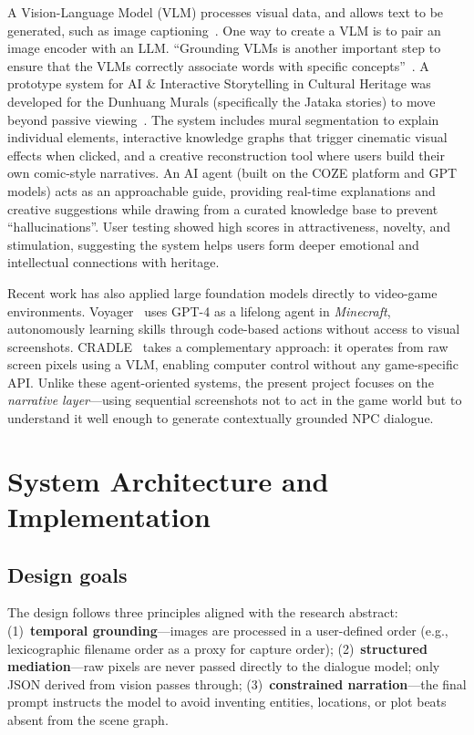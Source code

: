 \documentclass[11pt]{article}
\begin{document}
A Vision-Language Model (VLM) processes visual data, and allows text to be generated,
such as image captioning~\cite{bordes2024introductionvisionlanguagemodeling}.
One way to create a VLM is to pair an image encoder with an LLM.
``Grounding VLMs is another important step to ensure
that the VLMs correctly associate words with specific concepts''~\cite{bordes2024introductionvisionlanguagemodeling}.
A prototype system for AI \& Interactive Storytelling in Cultural Heritage was developed for the Dunhuang Murals (specifically the Jataka stories) to move beyond passive viewing~\cite{11227644}. The system includes mural segmentation to explain individual elements, interactive knowledge graphs that trigger cinematic visual effects when clicked, and a creative reconstruction tool where users build their own comic-style narratives. An AI agent (built on the COZE platform and GPT models) acts as an approachable guide, providing real-time explanations and creative suggestions while drawing from a curated knowledge base to prevent ``hallucinations''. User testing showed high scores in attractiveness, novelty, and stimulation, suggesting the system helps users form deeper emotional and intellectual connections with heritage.

Recent work has also applied large foundation models directly to video-game environments. Voyager~\cite{Wang2023Voyager} uses GPT-4 as a lifelong agent in \emph{Minecraft}, autonomously learning skills through code-based actions without access to visual screenshots. CRADLE~\cite{Tan2024CRADLE} takes a complementary approach: it operates from raw screen pixels using a VLM, enabling computer control without any game-specific API. Unlike these agent-oriented systems, the present project focuses on the \emph{narrative layer}---using sequential screenshots not to act in the game world but to understand it well enough to generate contextually grounded NPC dialogue.


\section{System Architecture and Implementation}

\subsection{Design goals}

The design follows three principles aligned with the research abstract: (1)~\textbf{temporal grounding}---images are processed in a user-defined order (e.g., lexicographic filename order as a proxy for capture order); (2)~\textbf{structured mediation}---raw pixels are never passed directly to the dialogue model; only JSON derived from vision passes through; (3)~\textbf{constrained narration}---the final prompt instructs the model to avoid inventing entities, locations, or plot beats absent from the scene graph.
\end{document}
